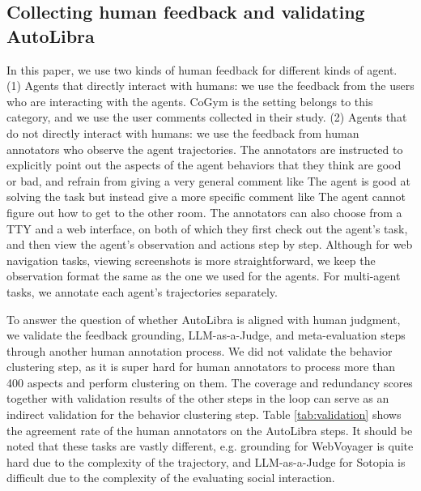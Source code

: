 \subsection{Collecting human feedback and validating AutoLibra}
\label{sec:collecting-human-feedback}

In this paper, we use two kinds of human feedback for different kinds of agent. (1) Agents that directly interact
with humans: we use the feedback from the users who are interacting with the agents. CoGym \citep{shao2024collaborative}
is the setting belongs to this category, and we use the user comments collected in their study. (2) Agents that 
do not directly interact with humans: we use the feedback from human annotators who observe the agent trajectories.
The annotators are instructed to explicitly point out the aspects of the agent behaviors that they think are good or bad,
and refrain from giving a very general comment like \textsf{The agent is good at solving the task}
but instead give a more specific comment like \textsf{The agent cannot figure out how to get to the other room}.
The annotators can also choose from a TTY and a web interface, on both of which they first check out the agent's task,
and then view the agent's observation and actions step by step. Although for web navigation tasks, viewing screenshots
is more straightforward, we keep the observation format the same as the one we used for the agents. 
For multi-agent tasks, we annotate each agent's trajectories separately.

To answer the question of whether AutoLibra is aligned with human judgment,
we validate the feedback grounding, LLM-as-a-Judge, and meta-evaluation steps through another human annotation process.
We did not validate the behavior clustering step, as it is super hard for human annotators to
process more than 400 aspects and perform clustering on them. The coverage and redundancy scores
together with validation results of the other steps in the loop can serve as an indirect validation for the 
behavior clustering step.
Table \ref{tab:validation} shows the agreement rate of the human annotators on the AutoLibra steps. 
It should be noted that these tasks are vastly different, e.g. grounding for WebVoyager \citep{he2024webvoyager} is quite hard 
due to the complexity of the trajectory, and LLM-as-a-Judge for Sotopia \citep{zhousotopia} is 
difficult due to the complexity of the evaluating social interaction. 